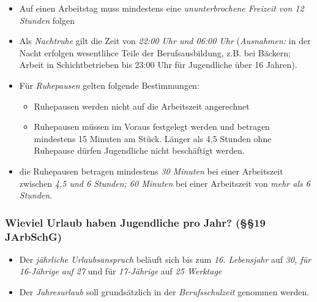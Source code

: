 \documentclass[a4paper, 12pt]{report}
\begin{document}
\begin{itemize}
    \item Auf einen Arbeitstag muss mindestens eine \emph{ununterbrochene 
        Freizeit von 12 Stunden} folgen
    \item Als \emph{Nachtruhe} gilt die Zeit von \emph{22:00 Uhr und 06:00 Uhr}
        (\emph{Ausnahmen:} in der Nacht erfolgen wesentlihce Teile der 
        Berufsausbildung, z.B. bei Bäckern; Arbeit in Schichtbetrieben bis 
        23:00 Uhr für Jugendliche über 16 Jahren).
    \item Für \emph{Ruhepausen} gelten folgende Bestimmungen: 
        \begin{itemize}
            \item Ruhepausen werden nicht auf die Arbeitszeit angerechnet
            \item Ruhepausen müssen im Voraus festgelegt werden und betragen 
                mindestens 15 Minuten am Stück. Länger als 4,5 Stunden ohne 
                Ruhepause dürfen Jugendliche nicht beschäftigt werden. 
        \end{itemize}
    \item die Ruhepausen betragen mindestens \emph{30 Minuten} bei einer 
        Arbeitszeit zwischen \emph{4,5 und 6 Stunden; 60 Minuten} bei einer
        Arbeitszeit von \emph{mehr als 6 Stunden}.
\end{itemize}

\subsubsection{Wieviel Urlaub haben Jugendliche pro Jahr? (\S\S 19 JArbSchG)}

\begin{itemize}
    \item Der \emph{jährliche Urlaubsanspruch} beläuft sich bis zum 
        \emph{16. Lebensjahr} auf \emph{30, für 16-Jährige auf 27} und für 
        \emph{17-Jährige} auf \emph{25 Werktage}
    \item Der \emph{Jahresurlaub} soll grundsätzlich in der 
        \emph{Berufsschulzeit} genommen werden. 
\end{itemize}
\end{document}
